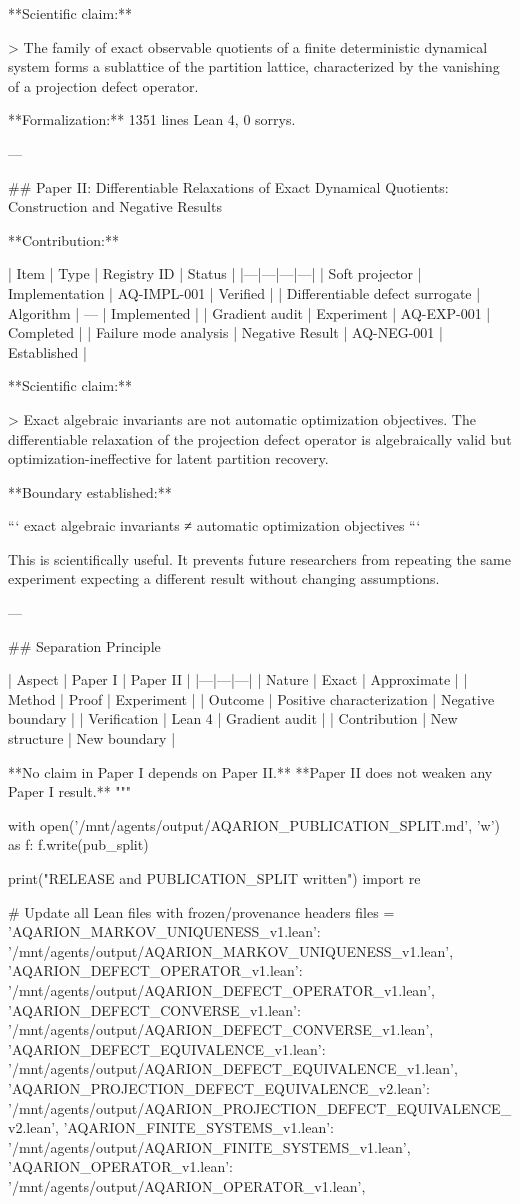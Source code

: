 **Scientific claim:**

> The family of exact observable quotients of a finite deterministic dynamical system forms a sublattice of the partition lattice, characterized by the vanishing of a projection defect operator.

**Formalization:** 1351 lines Lean 4, 0 sorrys.

---

## Paper II: Differentiable Relaxations of Exact Dynamical Quotients: Construction and Negative Results

**Contribution:**

| Item | Type | Registry ID | Status |
|---|---|---|---|
| Soft projector | Implementation | AQ-IMPL-001 | Verified |
| Differentiable defect surrogate | Algorithm | — | Implemented |
| Gradient audit | Experiment | AQ-EXP-001 | Completed |
| Failure mode analysis | Negative Result | AQ-NEG-001 | Established |

**Scientific claim:**

> Exact algebraic invariants are not automatic optimization objectives. The differentiable relaxation of the projection defect operator is algebraically valid but optimization-ineffective for latent partition recovery.

**Boundary established:**

```
exact algebraic invariants  ≠  automatic optimization objectives
```

This is scientifically useful. It prevents future researchers from repeating the same experiment expecting a different result without changing assumptions.

---

## Separation Principle

| Aspect | Paper I | Paper II |
|---|---|---|
| Nature | Exact | Approximate |
| Method | Proof | Experiment |
| Outcome | Positive characterization | Negative boundary |
| Verification | Lean 4 | Gradient audit |
| Contribution | New structure | New boundary |

**No claim in Paper I depends on Paper II.**
**Paper II does not weaken any Paper I result.**
"""

with open('/mnt/agents/output/AQARION_PUBLICATION_SPLIT.md', 'w') as f:
    f.write(pub_split)

print("RELEASE and PUBLICATION_SPLIT written")
import re

# Update all Lean files with frozen/provenance headers
files = {
    'AQARION_MARKOV_UNIQUENESS_v1.lean': '/mnt/agents/output/AQARION_MARKOV_UNIQUENESS_v1.lean',
    'AQARION_DEFECT_OPERATOR_v1.lean': '/mnt/agents/output/AQARION_DEFECT_OPERATOR_v1.lean',
    'AQARION_DEFECT_CONVERSE_v1.lean': '/mnt/agents/output/AQARION_DEFECT_CONVERSE_v1.lean',
    'AQARION_DEFECT_EQUIVALENCE_v1.lean': '/mnt/agents/output/AQARION_DEFECT_EQUIVALENCE_v1.lean',
    'AQARION_PROJECTION_DEFECT_EQUIVALENCE_v2.lean': '/mnt/agents/output/AQARION_PROJECTION_DEFECT_EQUIVALENCE_v2.lean',
    'AQARION_FINITE_SYSTEMS_v1.lean': '/mnt/agents/output/AQARION_FINITE_SYSTEMS_v1.lean',
    'AQARION_OPERATOR_v1.lean': '/mnt/agents/output/AQARION_OPERATOR_v1.lean',
}

